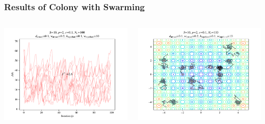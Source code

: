 \documentclass{beamer}
\begin{document}
\begin{frame}
\frametitle{Results of Colony with Swarming}
\begin{columns}[T]
    \begin{center}
      \includegraphics[scale=0.35]{assets/rastrigin_colony_J}
    \end{center}
  \begin{center}
    \includegraphics[scale=0.35]{assets/rastrigin_colony_theta}
  \end{center}
\end{columns}
\end{frame}
\end{document}
